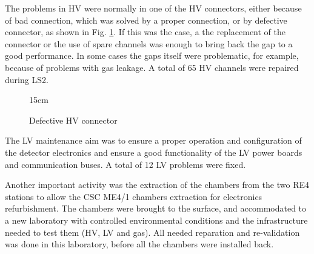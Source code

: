 The problems in HV were normally in one of the HV connectors, either because of bad connection, which was solved by a proper connection, or by defective connector, as shown in Fig. \ref{fig:HV_crack}. If this was the case, a the replacement of the connector or the use of spare channels was enough to bring back the gap to a good performance. In some cases the gaps itself were problematic, for example, because of problems with gas leakage. A total of 65 HV channels were repaired during LS2. 

\begin{figure}[!htm]{15cm} %
\caption{Defective HV connector}%
\label{fig:HV_crack}
\end{figure}

The LV maintenance aim was to ensure a proper operation and configuration of the detector electronics and ensure a good functionality of the LV power boards and communication buses. A total of 12 LV problems were fixed.

Another important activity was the extraction of the chambers from the two RE4 stations to allow the CSC ME4/1 chambers extraction for electronics  refurbishment. The chambers were brought to the surface, and accommodated to a new laboratory with controlled environmental conditions and the infrastructure needed to test them (HV, LV and gas). All needed reparation and re-validation was done in this laboratory, before all the chambers were installed back.

